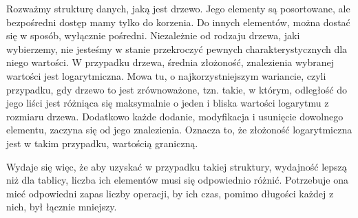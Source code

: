 Rozważmy strukturę danych, jaką jest drzewo. Jego elementy są posortowane, ale bezpośredni dostęp mamy tylko do korzenia. Do innych elementów, można dostać się w sposób, wyłącznie pośredni. Niezależnie od rodzaju drzewa, jaki wybierzemy, nie jesteśmy w stanie przekroczyć pewnych charakterystycznych dla niego wartości. W przypadku drzewa, średnia złożoność, znalezienia wybranej wartości jest logarytmiczna. Mowa tu, o najkorzystniejszym wariancie, czyli przypadku, gdy drzewo to jest zrównoważone, tzn. takie, w którym, odległość do jego liści jest różniąca się maksymalnie o jeden i bliska wartości logarytmu z rozmiaru drzewa. Dodatkowo każde dodanie, modyfikacja i usunięcie dowolnego elementu, zaczyna się od jego znalezienia. Oznacza to, że złożoność logarytmiczna jest w takim przypadku, wartością graniczną.

Wydaje się więc, że aby uzyskać w przypadku takiej struktury, wydajność lepszą niż dla tablicy, liczba ich elementów musi się odpowiednio różnić. Potrzebuje ona mieć odpowiedni zapas liczby operacji, by ich czas, pomimo długości każdej z nich, był łącznie mniejszy.	
